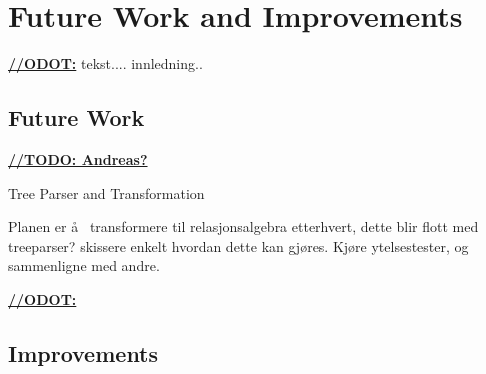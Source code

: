 \chapter{Future Work and Improvements}
\label{sect:summary:future_work}
\underline{\textbf{\LARGE //ODOT:}} tekst.... innledning..


\section{Future Work}
\underline{\textbf{\LARGE //TODO: Andreas?}}

Tree Parser and Transformation

Planen er \aa~ transformere til relasjonsalgebra etterhvert, dette blir flott med treeparser? skissere enkelt hvordan dette kan gj\o res. Kj\o re ytelsestester, og sammenligne med andre.

\underline{\textbf{\LARGE //ODOT:}}

\section{Improvements}
\label{sect:future:improvements}



